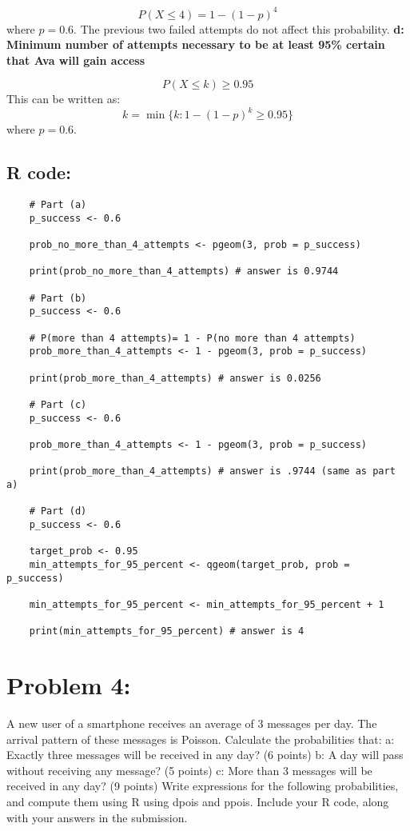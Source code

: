 \documentclass{article}
\begin{document}
\[
P(X \leq 4) = 1 - (1 - p)^4
\]
where \( p = 0.6 \). The previous two failed attempts do not affect this probability.
\newline
\newline
\textbf{d: Minimum number of attempts necessary to be at least 95\% certain that Ava will gain access}

\[
P(X \leq k) \geq 0.95
\]
This can be written as:
\[
k = \min \{ k: 1 - (1 - p)^k \geq 0.95 \}
\]
where \( p = 0.6 \).
\subsection{R code:}
\begin{lstlisting}
    # Part (a)
    p_success <- 0.6

    prob_no_more_than_4_attempts <- pgeom(3, prob = p_success)

    print(prob_no_more_than_4_attempts) # answer is 0.9744

    # Part (b)
    p_success <- 0.6

    # P(more than 4 attempts)= 1 - P(no more than 4 attempts)
    prob_more_than_4_attempts <- 1 - pgeom(3, prob = p_success)

    print(prob_more_than_4_attempts) # answer is 0.0256

    # Part (c)
    p_success <- 0.6

    prob_more_than_4_attempts <- 1 - pgeom(3, prob = p_success)

    print(prob_more_than_4_attempts) # answer is .9744 (same as part a)

    # Part (d)
    p_success <- 0.6

    target_prob <- 0.95
    min_attempts_for_95_percent <- qgeom(target_prob, prob = p_success)

    min_attempts_for_95_percent <- min_attempts_for_95_percent + 1

    print(min_attempts_for_95_percent) # answer is 4

\end{lstlisting}

\section{Problem 4:}
A new user of a smartphone receives an average of 3 messages per day. The arrival
pattern of these messages is Poisson. Calculate the probabilities that:
a: Exactly three messages will be received in any day? (6 points)
b: A day will pass without receiving any message? (5 points)
c: More than 3 messages will be received in any day? (9 points)
Write expressions for the following probabilities, and compute them using R using dpois
and ppois. Include your R code, along with your answers in the submission.
\end{document}
